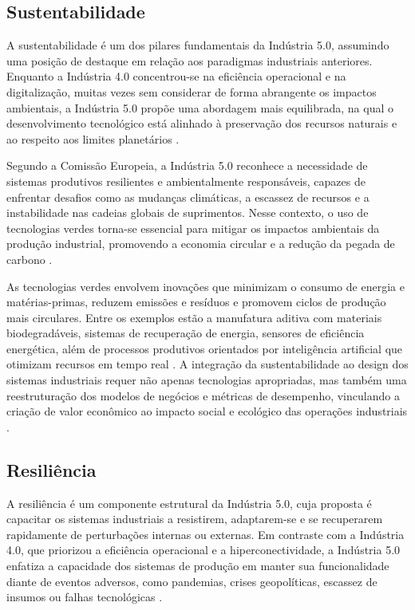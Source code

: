 \subsection{Sustentabilidade}

A sustentabilidade é um dos pilares fundamentais da Indústria 5.0, assumindo uma posição de destaque em relação aos paradigmas industriais anteriores.
Enquanto a Indústria 4.0 concentrou-se na eficiência operacional e na digitalização, muitas vezes sem considerar de forma abrangente os impactos ambientais, a Indústria 5.0 propõe uma abordagem mais equilibrada, na qual o desenvolvimento tecnológico está alinhado à preservação dos recursos naturais e ao respeito aos limites planetários \cite{VALETTE2023, silva2024, Rame2024}.

Segundo a Comissão Europeia, a Indústria 5.0 reconhece a necessidade de sistemas produtivos resilientes e ambientalmente responsáveis, capazes de enfrentar desafios como as mudanças climáticas, a escassez de recursos e a instabilidade nas cadeias globais de suprimentos.
Nesse contexto, o uso de tecnologias verdes torna-se essencial para mitigar os impactos ambientais da produção industrial, promovendo a economia circular e a redução da pegada de carbono \cite{Rame2024}.

As tecnologias verdes envolvem inovações que minimizam o consumo de energia e matérias-primas, reduzem emissões e resíduos e promovem ciclos de produção mais circulares.
Entre os exemplos estão a manufatura aditiva com materiais biodegradáveis, sistemas de recuperação de energia, sensores de eficiência energética, além de processos produtivos orientados por inteligência artificial que otimizam recursos em tempo real \cite{TOTH2023, silva2024}.
A integração da sustentabilidade ao design dos sistemas industriais requer não apenas tecnologias apropriadas, mas também uma reestruturação dos modelos de negócios e métricas de desempenho, vinculando a criação de valor econômico ao impacto social e ecológico das operações industriais \cite{Santos2025}.

\subsection{Resiliência}

A resiliência é um componente estrutural da Indústria 5.0, cuja proposta é capacitar os sistemas industriais a resistirem, adaptarem-se e se recuperarem rapidamente de perturbações internas ou externas.
Em contraste com a Indústria 4.0, que priorizou a eficiência operacional e a hiperconectividade, a Indústria 5.0 enfatiza a capacidade dos sistemas de produção em manter sua funcionalidade diante de eventos adversos, como pandemias, crises geopolíticas, escassez de insumos ou falhas tecnológicas \cite{euCommission2021, VALETTE2023, Khan2023}.

